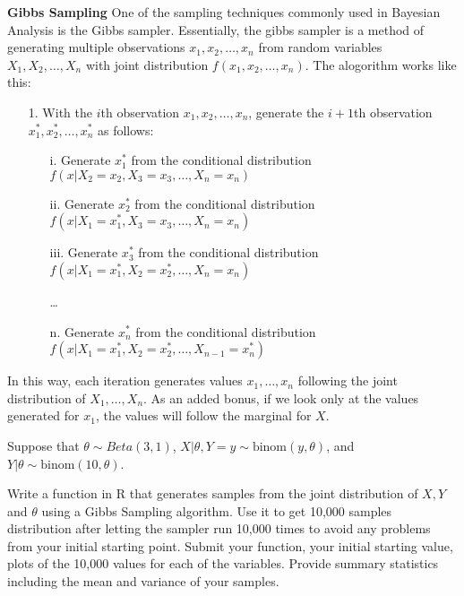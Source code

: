 \documentclass[addpoints]{examsetup}\usepackage[]{graphicx}\usepackage[]{color}
\begin{document}
\begin{questions}

\pagebreak
\question[30] \textbf{Gibbs Sampling}
One of the sampling techniques commonly used in Bayesian Analysis is the Gibbs sampler. Essentially, the gibbs sampler is a method of generating multiple observations $x_1, x_2, \ldots, x_n$ from random variables $X_1, X_2, \ldots, X_n$ with joint distribution $f(x_1, x_2, \ldots, x_n)$. The alogorithm works like this:

\begin{itemize}
   \item[1.] With the $i$th observation $x_1, x_2, \ldots, x_n$, generate the $i+1$th observation $x_1^{*}, x_2^{*}, \ldots, x_n^{*}$ as follows:
   \begin{itemize}
      \item[i.] Generate $x_1^{*}$ from the conditional distribution $f(x | X_2 = x_2, X_3 = x_3, \ldots, X_n = x_n)$
      \item[ii.] Generate $x_2^{*}$ from the conditional distribution $f(x | X_1 = x_1^{*}, X_3 = x_3, \ldots, X_n = x_n)$
      \item[iii.] Generate $x_3^{*}$ from the conditional distribution $f(x | X_1 = x_1^{*}, X_2 = x_2^{*}, \ldots, X_n = x_n)$
      \item[] \ldots
      \item[n.] Generate $x_n^{*}$ from the conditional distribution $f(x | X_1 = x_1^{*}, X_2 = x_2^{*}, \ldots, X_{n-1} = x_n^{*})$
   \end{itemize}
\end{itemize}
In this way, each iteration generates values $x_1, \ldots, x_n$ following the joint distribution of $X_1, \ldots, X_n$. As an added bonus, if we look only at the values generated for $x_1$, the values will follow the marginal for $X$.

Suppose that $\theta \sim Beta(3,1)$, $X|\theta, Y=y \sim \text{binom}(y, \theta)$, and $Y|\theta \sim \text{binom}(10, \theta)$. 

Write a function in R that generates samples from the joint distribution of $X, Y$ and $\theta$ using a Gibbs Sampling algorithm. Use it to get 10,000 samples distribution after letting the sampler run 10,000 times to avoid any problems from your initial starting point.
Submit your function, your initial starting value, plots of the 10,000 values for each of the variables. Provide summary statistics including the mean and variance of your samples.

   
\end{questions}
\end{document}
